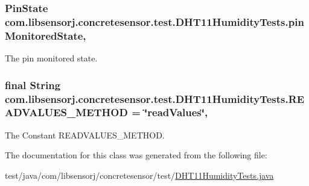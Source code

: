 \subsubsection[{pin\+Monitored\+State}]{\setlength{\rightskip}{0pt plus 5cm}Pin\+State com.\+libsensorj.\+concretesensor.\+test.\+D\+H\+T11\+Humidity\+Tests.\+pin\+Monitored\+State\hspace{0.3cm}{\ttfamily [static]}, {\ttfamily [private]}}\label{classcom_1_1libsensorj_1_1concretesensor_1_1test_1_1DHT11HumidityTests_aa4907b3b4ddbc118b0bb5a8571d17202}
The pin monitored state. \hypertarget{classcom_1_1libsensorj_1_1concretesensor_1_1test_1_1DHT11HumidityTests_a990e9ce8e27fda4153926133ef67cb4f}{}
\subsubsection[{R\+E\+A\+D\+V\+A\+L\+U\+E\+S\+\_\+\+M\+E\+T\+H\+O\+D}]{\setlength{\rightskip}{0pt plus 5cm}final String com.\+libsensorj.\+concretesensor.\+test.\+D\+H\+T11\+Humidity\+Tests.\+R\+E\+A\+D\+V\+A\+L\+U\+E\+S\+\_\+\+M\+E\+T\+H\+O\+D = \char`\"{}read\+Values\char`\"{}\hspace{0.3cm}{\ttfamily [static]}, {\ttfamily [private]}}\label{classcom_1_1libsensorj_1_1concretesensor_1_1test_1_1DHT11HumidityTests_a990e9ce8e27fda4153926133ef67cb4f}
The Constant R\+E\+A\+D\+V\+A\+L\+U\+E\+S\+\_\+\+M\+E\+T\+H\+O\+D. 

The documentation for this class was generated from the following file\+:\begin{DoxyCompactItemize}
\item 
test/java/com/libsensorj/concretesensor/test/\hyperlink{DHT11HumidityTests_8java}{D\+H\+T11\+Humidity\+Tests.\+java}\end{DoxyCompactItemize}
